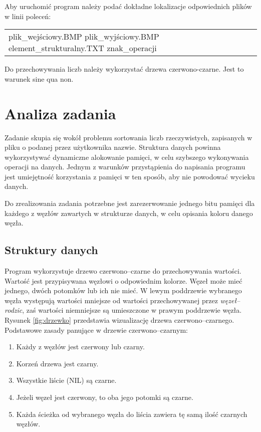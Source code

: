 \documentclass[12pt,a4paper,twoside]{article}
\begin{document}
Aby uruchomić program należy podać dokładne lokalizacje odpowiednich plików w linii poleceń: \par
\begin{tabular}{ll}
{plik_wejściowy.BMP plik_wyjściowy.BMP element_strukturalny.TXT znak_operacji}\\
\end{tabular}

Do przechowywania liczb należy wykorzystać drzewa czerwono-czarne. Jest to warunek sine qua non.\\


\section{Analiza zadania}

Zadanie skupia się wokół problemu sortowania liczb rzeczywistych, zapisanych w pliku o podanej przez użytkownika nazwie. Struktura danych powinna wykorzystywać dynamiczne alokowanie pamięci, w celu szybszego wykonywania operacji na danych. Jednym z warunków przystąpienia do napisania programu jest umiejętność korzystania z pamięci w ten sposób, aby nie powodować wycieku danych. 

Do zrealizowania zadania potrzebne jest zarezerwowanie jednego bitu pamięci dla każdego z węzłów zawartych w strukturze danych, w celu opisania koloru danego węzła.
	
\subsection{Struktury danych}

Program wykorzystuje drzewo czerwono–czarne do przechowywania wartości. Wartość jest przypisywana węzłowi o odpowiednim kolorze. Węzeł może mieć jednego, dwóch potomków lub ich nie mieć. W lewym poddrzewie wybranego węzła występują wartości mniejsze od wartości przechowywanej przez \emph{węzeł–rodzic}, zaś wartości niemniejsze są umieszczone w prawym poddrzewie węzła. Rysunek  \ref{fig:drzewko} przedstawia wizualizację drzewa czerwono–czarnego. \\

\noindent Podstawowe zasady panujące w drzewie czerwono–czarnym:~\cite{id:Cormen2009introductionToAlgorithms}
\begin{enumerate}
	\item{Każdy z węzłów jest czerwony lub czarny.}
	\item{Korzeń drzewa jest czarny.}
	\item{Wszystkie liście (NIL) są czarne.}
	\item{Jeżeli węzeł jest czerwony, to oba jego potomki są czarne.}
	\item{Każda ścieżka od wybranego węzła do liścia zawiera tę samą ilość czarnych węzłów.}	
\end{enumerate}
\label{zasady_drzewa}
\end{document}
